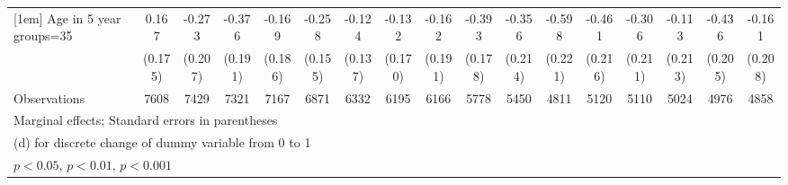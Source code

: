 {\begin{tabular}{l*{16}{c}}
[1em]
Age in 5 year groups=35&       0.167         &      -0.273         &      -0.376\sym{*}  &      -0.169         &      -0.258         &      -0.124         &      -0.132         &      -0.162         &      -0.393\sym{*}  &      -0.356         &      -0.598\sym{**} &      -0.461\sym{*}  &      -0.306         &      -0.113         &      -0.436\sym{*}  &      -0.161         \\
                    &     (0.175)         &     (0.207)         &     (0.191)         &     (0.186)         &     (0.155)         &     (0.137)         &     (0.170)         &     (0.191)         &     (0.178)         &     (0.214)         &     (0.221)         &     (0.216)         &     (0.211)         &     (0.213)         &     (0.205)         &     (0.208)         \\
\hline
Observations        &        7608         &        7429         &        7321         &        7167         &        6871         &        6332         &        6195         &        6166         &        5778         &        5450         &        4811         &        5120         &        5110         &        5024         &        4976         &        4858         \\
\hline\hline
\multicolumn{17}{l}{\footnotesize Marginal effects; Standard errors in parentheses}\\
\multicolumn{17}{l}{\footnotesize  (d) for discrete change of dummy variable from 0 to 1}\\
\multicolumn{17}{l}{\footnotesize \sym{*} \(p<0.05\), \sym{**} \(p<0.01\), \sym{***} \(p<0.001\)}\\
\end{tabular}
}
